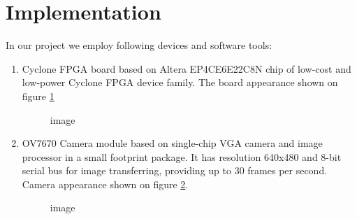 \documentclass[a4paper,12pt]{article} %
\newcommand{\RomanNumeralCaps}[1]
{\MakeUppercase{\romannumeral #1}}
\begin{document}
\section*{Implementation}
\noindent In our project we employ following devices and software tools:
\begin{enumerate}
	
	\item 
	Cyclone \RomanNumeralCaps{4} FPGA board based on Altera EP4CE6E22C8N chip of low-cost and low-power Cyclone \RomanNumeralCaps{4} FPGA device family. The board appearance shown on figure \ref{fig:im1}
	
	\begin{figure}[h]
		\caption{image}
		\label{fig:im1}
	\end{figure}
	
	
	\item
	OV7670 Camera module based on  single-chip VGA camera and image processor in a small footprint package. It has resolution 640x480 and 8-bit serial bus for image transferring, providing up to 30 frames per second. Camera appearance shown on figure \ref{fig:im2}.
	
	\begin{figure}[h]
		\caption{image}
		\label{fig:im2}
	\end{figure}
	

\end{enumerate}
\end{document}
